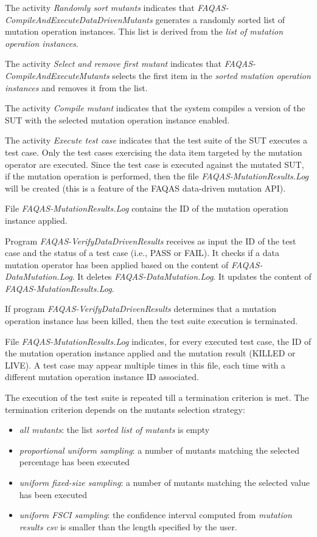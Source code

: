 \RQ{} The activity \emph{Randomly sort mutants} indicates that  \emph{FAQAS-CompileAndExecuteDataDrivenMutants} generates a randomly sorted list of mutation operation instances. This list is derived from the \emph{list of mutation operation instances}.

\RQ{} The activity \emph{Select and remove first mutant} indicates that  \emph{FAQAS-CompileAndExecuteMutants} selects the first item in the \emph{sorted mutation operation instances} and removes it from the list.

\RQ{} The activity \emph{Compile mutant} indicates that the system compiles a version of the SUT with the selected mutation operation instance enabled.

\RQ{} The activity \emph{Execute test case} indicates that the test suite of the SUT executes a test case. Only the test cases exercising the data item targeted by the mutation operator are executed. Since the test case is executed against the mutated SUT, if the mutation operation is performed, then the file \emph{FAQAS-MutationResults.Log} will be created (this is a feature of the FAQAS data-driven mutation API).

\RQ{} File \emph{FAQAS-MutationResults.Log} contains the ID of the mutation operation instance applied.

\RQ{} Program \emph{FAQAS-VerifyDataDrivenResults} receives as input the ID of the test case and  the status of a test case (i.e., PASS or FAIL). It checks if a data mutation operator has been applied based on the content of \emph{FAQAS-DataMutation.Log}. It deletes \emph{FAQAS-DataMutation.Log}. It updates the content of \emph{FAQAS-MutationResults.Log}.

\RQ{} If program \emph{FAQAS-VerifyDataDrivenResults} determines that a mutation operation instance has been killed, then the test suite execution is terminated.

\RQ{} File \emph{FAQAS-MutationResults.Log} indicates, for every executed test case, the ID of the mutation operation instance applied and the mutation result (KILLED or LIVE). A test case may appear multiple times in this file, each time with a different mutation operation instance ID associated.

\RQ{} The execution of the test suite is repeated till a termination criterion is met. The termination criterion depends on the mutants selection strategy:
\begin{itemize}
\item \emph{all mutants}: the list \emph{sorted list of mutants} is empty
\item \emph{proportional uniform sampling}: a number of mutants matching the selected percentage has been executed
\item \emph{uniform fixed-size sampling}: a number of mutants matching the selected value has been executed
\item \emph{uniform FSCI sampling}: the confidence interval computed from \emph{mutation results csv} is smaller than the length specified by the user.
\end{itemize}

